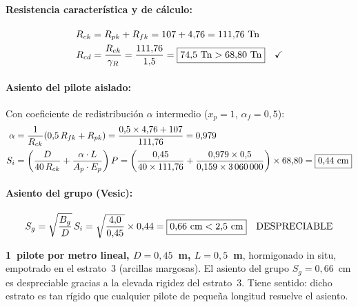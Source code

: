 \paragraph{Resistencia característica y de cálculo:}
\begin{align*}
  R_{ck} &= R_{pk} + R_{fk} = 107 + 4{,}76 = 111{,}76~\text{Tn} \\
  R_{cd} &= \frac{R_{ck}}{\gamma_R} = \frac{111{,}76}{1{,}5}
           = \boxed{74{,}5~\text{Tn} > 68{,}80~\text{Tn}} \quad\checkmark
\end{align*}

\paragraph{Asiento del pilote aislado:}

Con coeficiente de redistribución $\alpha$ intermedio ($x_p = 1$,
$\alpha_f = 0{,}5$):
\begin{align*}
  \alpha &= \frac{1}{R_{ck}}\!\left(0{,}5\,R_{fk} + R_{pk}\right)
           = \frac{0{,}5\times 4{,}76 + 107}{111{,}76} = 0{,}979 \\
  S_i    &= \left(\frac{D}{40\,R_{ck}} + \frac{\alpha\cdot L}{A_p\cdot E_p}\right)P
           = \left(\frac{0{,}45}{40\times 111{,}76}
             + \frac{0{,}979\times 0{,}5}{0{,}159\times 3\,060\,000}\right)
             \times 68{,}80
           = \boxed{0{,}44~\text{cm}}
\end{align*}

\paragraph{Asiento del grupo (Vesic):}
\begin{equation}
  S_g = \sqrt{\frac{B_g}{D}}\,S_i
      = \sqrt{\frac{4{,}0}{0{,}45}}\times 0{,}44
      = \boxed{0{,}66~\text{cm} < 2{,}5~\text{cm}} \quad\text{DESPRECIABLE}
\end{equation}

\begin{resultadobox}
  \textbf{1~pilote por metro lineal, $D = 0{,}45$~m, $L = 0{,}5$~m},
  hormigonado in situ, empotrado en el estrato~3 (arcillas margosas).
  El asiento del grupo $S_g = 0{,}66$~cm es despreciable gracias a
  la elevada rigidez del estrato~3. Tiene sentido: dicho estrato es
  tan rígido que cualquier pilote de pequeña longitud resuelve el
  asiento.
\end{resultadobox}

